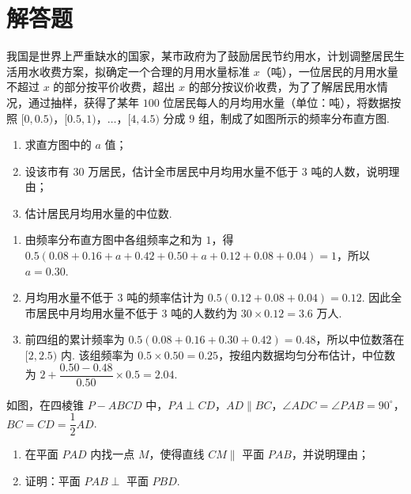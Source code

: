 \section{解答题}

\begin{problem}
我国是世界上严重缺水的国家，某市政府为了鼓励居民节约用水，计划调整居民生活用水收费方案，拟确定一个合理的月用水量标准 \(x\)（吨），一位居民的月用水量不超过 \(x\) 的部分按平价收费，超出 \(x\) 的部分按议价收费，为了了解居民用水情况，通过抽样，获得了某年 \(100\) 位居民每人的月均用水量（单位：吨），将数据按照 \([0,0.5)\)，\([0.5,1)\)，\(\dots\)，\([4,4.5)\) 分成 \(9\) 组，制成了如图所示的频率分布直方图.

\begin{enumerate}
\item 求直方图中的 \(a\) 值；
\item 设该市有 \(30\) 万居民，估计全市居民中月均用水量不低于 \(3\) 吨的人数，说明理由；
\item 估计居民月均用水量的中位数.
\end{enumerate}

\end{problem}

\begin{solution}
\begin{enumerate}
\item 由频率分布直方图中各组频率之和为 \(1\)，得
\(0.5\left(0.08+0.16+a+0.42+0.50+a+0.12+0.08+0.04\right)=1\)，所以 \(a=0.30\).
\item 月均用水量不低于 \(3\) 吨的频率估计为
\(0.5\left(0.12+0.08+0.04\right)=0.12\). 因此全市居民中月均用水量不低于 \(3\) 吨的人数约为 \(30\times0.12=3.6\) 万人.
\item 前四组的累计频率为
\(0.5\left(0.08+0.16+0.30+0.42\right)=0.48\)，所以中位数落在 \([2,2.5)\) 内. 该组频率为 \(0.5\times0.50=0.25\)，按组内数据均匀分布估计，中位数为
\(2+\dfrac{0.50-0.48}{0.50}\times0.5=2.04\).
\end{enumerate}
\end{solution}

\begin{problem}
如图，在四棱锥 \(P-ABCD\) 中，\(PA\perp CD\)，\(AD\parallel BC\)，\(\angle ADC=\angle PAB=90^\circ\)，\(BC=CD=\dfrac12 AD\).

\begin{enumerate}
\item 在平面 \(PAD\) 内找一点 \(M\)，使得直线 \(CM\parallel\) 平面 \(PAB\)，并说明理由；
\item 证明：平面 \(PAB\perp\) 平面 \(PBD\).
\end{enumerate}

\end{problem}

